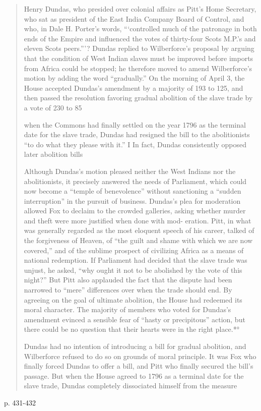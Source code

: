 \documentclass{scrartcl}
\begin{document}
\begin{quotation}
    Henry Dundas, who presided over colonial affairs as Pitt’s Home
Secretary, who sat as president of the East India Company Board of
Control, and who, in Dale H. Porter’s words, “‘controlled much of the
patronage in both ends of the Empire and influenced the votes of
thirty-four Scots M.P.’s and eleven Scots peers.”’? Dundas replied to
Wilberforce’s proposal by arguing that the condition of West Indian
slaves must be improved before imports from Africa could be stopped;
he therefore moved to amend Wilberforce’s motion by adding the
word “gradually.” On the morning of April 3, the House accepted
Dundas’s amendment by a majority of 193 to 125, and then passed the
resolution favoring gradual abolition of the slave trade by a vote of
230 to 85

when the Commons had finally settled on the year 1796 as the
terminal date for the slave trade, Dundas had resigned the bill to the abolitionists
``to do what they please with it.'' I In fact, Dundas consistently opposed later abolition bills


Although Dundas’s motion pleased neither the West Indians nor
the abolitionists, it precisely answered the needs of Parliament, which
could now become a “temple of benevolence” without sanctioning a
“sudden interruption” in the pursuit of business. Dundas’s plea for
moderation allowed Fox to declaim to the crowded galleries, asking
whether murder and theft were more justified when done with mod-
eration. Pitt, in what was generally regarded as the most eloquent
speech of his career, talked of the forgiveness of Heaven, of “the guilt
and shame with which we are now covered,” and of the sublime
prospect of civilizing Africa as a means of national redemption. If
Parliament had decided that the slave trade was unjust, he asked, “why
ought it not to be abolished by the vote of this night?” But Pitt also
applauded the fact that the dispute had been narrowed to “mere”
differences over when the trade should end. By agreeing on the goal
of ultimate abolition, the House had redeemed its moral character.
The majority of members who voted for Dundas’s amendment evinced
a sensible fear of “hasty or precipitous” action, but there could be no
question that their hearts were in the right place.*°

 Dundas had no intention of introducing a bill for gradual
abolition, and Wilberforce refused to do so on grounds of moral
principle. It was Fox who finally forced Dundas to offer a bill, and
Pitt who finally secured the bill’s passage. But when the House agreed
to 1796 as a terminal date for the slave trade, Dundas completely
dissociated himself from the measure
\end{quotation}
\cite{davis_1975}{p. 431-432}
\end{document}
